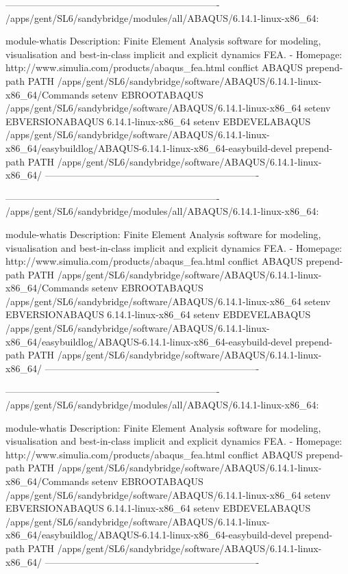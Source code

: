 \ifantwerpen
\begin{prompt}
-------------------------------------------------------------------
/apps/gent/SL6/sandybridge/modules/all/ABAQUS/6.14.1-linux-x86_64:

module-whatis    Description: Finite Element Analysis software for modeling, visualisation and best-in-class implicit and explicit dynamics FEA. - Homepage: http://www.simulia.com/products/abaqus_fea.html
conflict     ABAQUS
prepend-path PATH /apps/gent/SL6/sandybridge/software/ABAQUS/6.14.1-linux-x86_64/Commands
setenv       EBROOTABAQUS /apps/gent/SL6/sandybridge/software/ABAQUS/6.14.1-linux-x86_64
setenv       EBVERSIONABAQUS 6.14.1-linux-x86_64
setenv       EBDEVELABAQUS /apps/gent/SL6/sandybridge/software/ABAQUS/6.14.1-linux-x86_64/easybuildlog/ABAQUS-6.14.1-linux-x86_64-easybuild-devel
prepend-path PATH /apps/gent/SL6/sandybridge/software/ABAQUS/6.14.1-linux-x86_64/
-------------------------------------------------------------------
\end{prompt}
\fi
\ifgent
\begin{prompt}
-------------------------------------------------------------------
/apps/gent/SL6/sandybridge/modules/all/ABAQUS/6.14.1-linux-x86_64:

module-whatis    Description: Finite Element Analysis software for modeling, visualisation and best-in-class implicit and explicit dynamics FEA. - Homepage: http://www.simulia.com/products/abaqus_fea.html
conflict     ABAQUS
prepend-path PATH /apps/gent/SL6/sandybridge/software/ABAQUS/6.14.1-linux-x86_64/Commands
setenv       EBROOTABAQUS /apps/gent/SL6/sandybridge/software/ABAQUS/6.14.1-linux-x86_64
setenv       EBVERSIONABAQUS 6.14.1-linux-x86_64
setenv       EBDEVELABAQUS /apps/gent/SL6/sandybridge/software/ABAQUS/6.14.1-linux-x86_64/easybuildlog/ABAQUS-6.14.1-linux-x86_64-easybuild-devel
prepend-path PATH /apps/gent/SL6/sandybridge/software/ABAQUS/6.14.1-linux-x86_64/
-------------------------------------------------------------------
\end{prompt}
\fi
\ifbrussel
\begin{prompt}
-------------------------------------------------------------------
/apps/gent/SL6/sandybridge/modules/all/ABAQUS/6.14.1-linux-x86_64:

module-whatis    Description: Finite Element Analysis software for modeling, visualisation and best-in-class implicit and explicit dynamics FEA. - Homepage: http://www.simulia.com/products/abaqus_fea.html
conflict     ABAQUS
prepend-path PATH /apps/gent/SL6/sandybridge/software/ABAQUS/6.14.1-linux-x86_64/Commands
setenv       EBROOTABAQUS /apps/gent/SL6/sandybridge/software/ABAQUS/6.14.1-linux-x86_64
setenv       EBVERSIONABAQUS 6.14.1-linux-x86_64
setenv       EBDEVELABAQUS /apps/gent/SL6/sandybridge/software/ABAQUS/6.14.1-linux-x86_64/easybuildlog/ABAQUS-6.14.1-linux-x86_64-easybuild-devel
prepend-path PATH /apps/gent/SL6/sandybridge/software/ABAQUS/6.14.1-linux-x86_64/
-------------------------------------------------------------------
\end{prompt}
